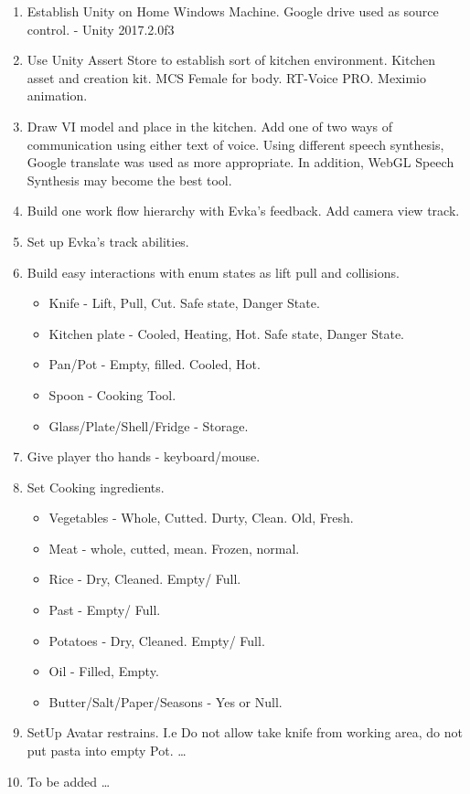 \documentclass[18pt]{article}
\numberwithin{equation}{section} %
\numberwithin{figure}{section} %
\numberwithin{table}{section} %
\begin{document}
	\begin{enumerate}
		\item Establish Unity on Home Windows Machine. Google drive used as source control. - Unity 2017.2.0f3
		\item Use Unity Assert Store to establish sort of kitchen environment. Kitchen asset and creation kit. MCS Female for body. RT-Voice PRO. Meximio animation. 
		\item Draw VI model and place in the kitchen. Add one of two ways of communication using either text of voice. Using different speech synthesis, Google translate was used as more appropriate. In addition, WebGL Speech Synthesis may become the best tool.
		\item Build one work flow hierarchy with Evka's feedback. Add camera view track.
		\item Set up Evka's track abilities.
		\item Build easy interactions with enum states as lift pull and collisions.
		\begin{itemize}
			\item Knife - Lift, Pull, Cut. Safe state, Danger State.
			\item Kitchen plate - Cooled, Heating, Hot. Safe state, Danger State.
			\item Pan/Pot - Empty, filled. Cooled, Hot.
			\item Spoon - Cooking Tool.
			\item Glass/Plate/Shell/Fridge - Storage.
		\end{itemize}
		\item Give player tho hands - keyboard/mouse.
		\item Set Cooking ingredients.
		\begin{itemize}
			\item Vegetables - Whole, Cutted. Durty, Clean. Old, Fresh.
			\item Meat - whole, cutted, mean. Frozen, normal.
			\item Rice - Dry, Cleaned. Empty/ Full.
			\item Past - Empty/ Full.
			\item Potatoes - Dry, Cleaned. Empty/ Full.
			\item Oil - Filled, Empty.
			\item Butter/Salt/Paper/Seasons - Yes or Null.
		\end{itemize}
		\item SetUp Avatar restrains. I.e Do not allow take knife from working area, do not put pasta into empty Pot. \ldots
		\item To be added \ldots
	
		
	\end{enumerate}
	
\end{document}
